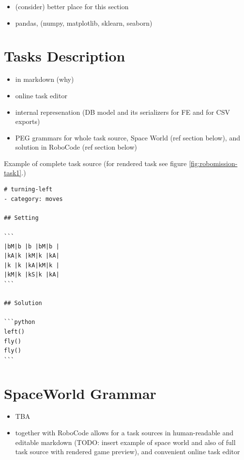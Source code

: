 \begin{itemize}
\item (consider) better place for this section
\item pandas, (numpy, matplotlib, sklearn, seaborn)
\end{itemize}


\section{Tasks Description}

\begin{itemize}
\item in markdown (why)
\item online task editor
\item internal represenation (DB model and its serializers for FE and for CSV exports)
\item PEG grammars for whole task source, Space World (ref section below),
  and solution in RoboCode (ref section below)
\end{itemize}

Example of complete task source (for rendered task see figure \ref{fig:robomission-task1}.)

\begin{lstlisting}
# turning-left
- category: moves

## Setting

```
|bM|b |b |bM|b |
|kA|k |kM|k |kA|
|k |k |kA|kM|k |
|kM|k |kS|k |kA|
```

## Solution

```python
left()
fly()
fly()
```
\end{lstlisting}


\section{SpaceWorld Grammar}

\begin{itemize}
\item TBA
\item together with RoboCode allows for a task sources in human-readable and editable markdown (TODO: insert example of space world and also of full task source with rendered game preview), and convenient online task editor
\end{itemize}


